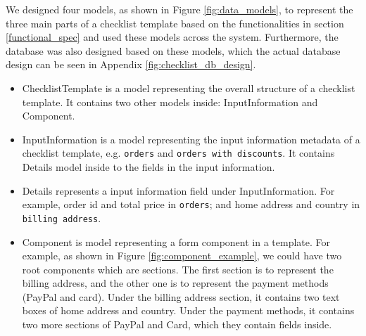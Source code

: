 

We designed four models, as shown in Figure \ref{fig:data_models}, to represent the three main parts of a checklist template based on the functionalities in section \ref{functional_spec} and used these models across the system. Furthermore, the database was also designed based on these models, which the actual database design can be seen in Appendix \ref{fig:checklist_db_design}.
\begin{itemize}
    \item ChecklistTemplate is a model representing the overall structure of a checklist template. It contains two other models inside: InputInformation and Component.
    \item InputInformation is a model representing the input information metadata of a checklist template, e.g. \verb!orders! and \verb!orders with discounts!. It contains Details model inside to the fields in the input information.
    \item Details represents a input information field under InputInformation. For example, order id and total price in \verb!orders!; and home address and country in \verb!billing address!.
    \item Component is model representing a form component in a template. For example, as shown in Figure \ref{fig:component_example}, we could have two root components which are sections. The first section is to represent the billing address, and the other one is to represent the payment methods (PayPal and card). Under the billing address section, it contains two text boxes of home address and country. Under the payment methods, it contains two more sections of PayPal and Card, which they contain fields inside.
\end{itemize}


